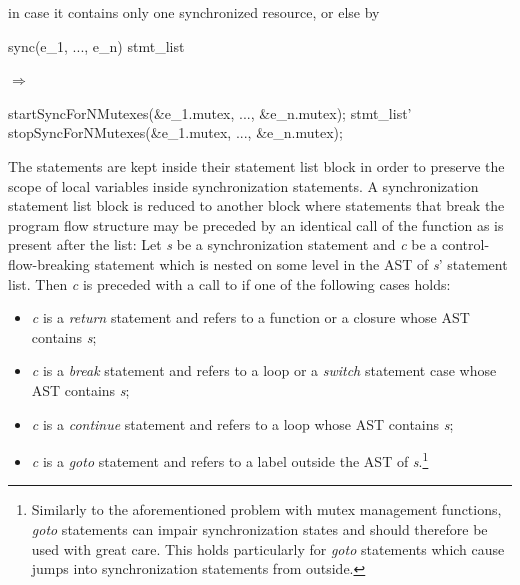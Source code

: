 in case it contains only one synchronized resource, or else by

\vspace{4mm}
\begin{minipage}{1\textwidth}
\begin{center}
\begin{minipage}{0.31\textwidth}
\begin{ccode}{}
sync(e_1, ..., e_n) stmt_list
\end{ccode}
\end{minipage}
\qquad$\Longrightarrow$\qquad\quad
\begin{minipage}{0.5\textwidth}
\begin{ccode}{}
startSyncForNMutexes(&e_1.mutex, ..., &e_n.mutex);
stmt_list'
stopSyncForNMutexes(&e_1.mutex, ..., &e_n.mutex);
\end{ccode}
\end{minipage}
\end{center}
\end{minipage}
\vspace{2mm}

The statements are kept inside their statement list block in order to preserve the scope of local variables inside synchronization statements. A synchronization statement list block is reduced to another block where statements that break the program flow structure may be preceded by an identical call of the  function as is present after the list: Let \textit{s} be a synchronization statement and \textit{c} be a control-flow-breaking statement which is nested on some level in the AST of \textit{s}' statement list. Then \textit{c} is preceded with a call to  if one of the following cases holds:
\begin{itemize}
\item \textit{c} is a \textit{return} statement and refers to a function or a closure whose AST contains \textit{s};
\item \textit{c} is a \textit{break} statement and refers to a loop or a \textit{switch} statement case whose AST contains \textit{s};
\item \textit{c} is a \textit{continue} statement and refers to a loop whose AST contains \textit{s};
\item \textit{c} is a \textit{goto} statement and refers to a label outside the AST of \textit{s}.\footnote{Similarly to the aforementioned problem with mutex management functions, \textit{goto} statements can impair synchronization states and should therefore be used with great care. This holds particularly for \textit{goto} statements which cause jumps into synchronization statements from outside.}
\end{itemize}

